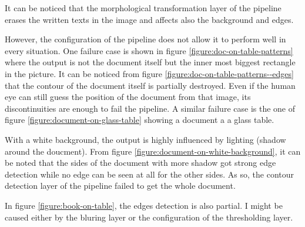 \documentclass{scrartcl}
\begin{document}
  It can be noticed that the morphological transformation layer of the pipeline erases the written
  texts in the image and affects also the background and edges.

  However, the configuration of the pipeline does not allow it to perform well in every situation.
  One failure case is shown in figure \ref{figure:doc-on-table-patterns} where the output is not
  the document itself but the inner most biggest rectangle in the picture. It can be noticed from
  figure \ref{figure:doc-on-table-patterns--edges} that the contour of the document itself is
  partially destroyed. Even if the human eye can still guess the position of the document from that
  image, its discontinuities are enough to fail the pipeline. A similar failure case is the one
  of figure \ref{figure:document-on-glass-table} showing a document a a glass table.

  With a white background, the output is highly influenced by lighting (shadow around the doucment).
  From figure \ref{figure:document-on-white-background}, it can be noted that the sides of the document with
  more shadow got strong edge detection while no edge can be seen at all for the other sides. As so,
  the contour detection layer of the pipeline failed to get the whole document.

  In figure \ref{figure:book-on-table}, the edges detection is also partial. I might be caused either
  by the bluring layer or the configuration of the thresholding layer.
\end{document}
